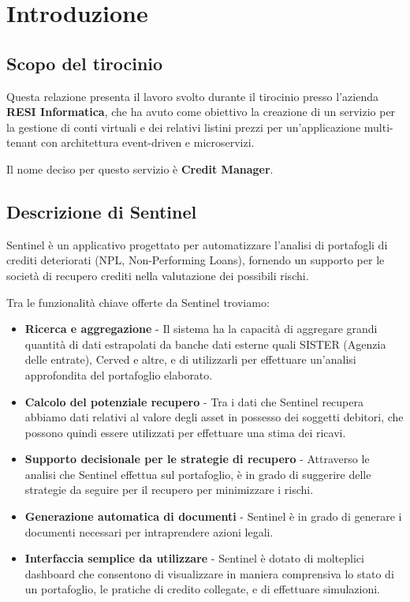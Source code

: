 \chapter{Introduzione}

\section{Scopo del tirocinio}
Questa relazione presenta il lavoro svolto durante il tirocinio presso l'azienda \textbf{RESI Informatica}, che ha avuto come obiettivo la creazione di un servizio per la
gestione di conti virtuali e dei relativi listini prezzi per un'applicazione multi-tenant con architettura event-driven e microservizi.

Il nome deciso per questo servizio \`e \textbf{Credit Manager}.

\section{Descrizione di Sentinel}
Sentinel \`e un applicativo progettato per automatizzare l'analisi di portafogli di crediti deteriorati (NPL, Non-Performing Loans), fornendo un supporto per le societ\`a
di recupero crediti nella valutazione dei possibili rischi.

Tra le funzionalit\`a chiave offerte da Sentinel troviamo:
\begin{itemize}
  \item \textbf{Ricerca e aggregazione} - Il sistema ha la capacit\`a di aggregare grandi quantit\`a di dati estrapolati da banche dati esterne quali SISTER (Agenzia delle entrate), Cerved e altre, e di utilizzarli
    per effettuare un'analisi approfondita del portafoglio elaborato.
  \item \textbf{Calcolo del potenziale recupero} - Tra i dati che Sentinel recupera abbiamo dati relativi al valore degli asset in possesso dei soggetti debitori, che possono
    quindi essere utilizzati per effettuare una stima dei ricavi.
  \item \textbf{Supporto decisionale per le strategie di recupero} - Attraverso le analisi che Sentinel effettua sul portafoglio, \`e in grado di suggerire delle strategie
    da seguire per il recupero per minimizzare i rischi.
  \item \textbf{Generazione automatica di documenti} - Sentinel \`e in grado di generare i documenti necessari per intraprendere azioni legali.
  \item \textbf{Interfaccia semplice da utilizzare} - Sentinel \`e dotato di molteplici dashboard che consentono di visualizzare in maniera comprensiva lo stato di un portafoglio,
    le pratiche di credito collegate, e di effettuare simulazioni.
\end{itemize}

